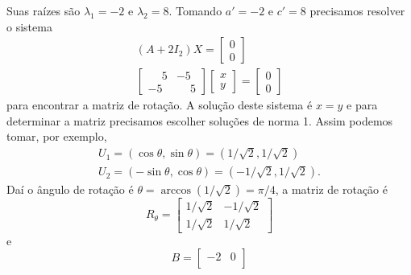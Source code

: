 \begin{exemplos}
\begin{enumerate}
\begin{solucao}
                  Suas raízes são $\lambda_1 = -2$ e $\lambda_2 = 8$. Tomando $a' = -2$ e $c' = 8$ precisamos resolver o sistema
                  \begin{align*}
                      (A + 2I_2)X = \begin{bmatrix}
                                        0 \\0
                                    \end{bmatrix} \\
                      \begin{bmatrix}
                          \phantom{-}5 & -5           \\
                          -5           & \phantom{-}5
                      \end{bmatrix} \begin{bmatrix}
                                        x \\y
                                    \end{bmatrix} = \begin{bmatrix}
                                                        0 \\0
                                                    \end{bmatrix}
                  \end{align*}
                  para encontrar a matriz de rotação. A solução deste sistema é $x = y$ e para determinar a matriz precisamos escolher soluções de norma 1.
                  Assim podemos tomar, por exemplo,
                  \begin{align*}
                      U_1 = (\cos\theta, \sin\theta) = (1/\sqrt{2}, 1/\sqrt{2}) \\
                      U_2 = (-\sin\theta, \cos\theta) = (-1/\sqrt{2}, 1/\sqrt{2}).
                  \end{align*}
                  Daí o ângulo de rotação é $\theta = \arccos(1/\sqrt{2}) = \pi/4$, a matriz de rotação é
                  \[
                      R_\theta = \begin{bmatrix}
                          1/\sqrt{2} & -1/\sqrt{2} \\
                          1/\sqrt{2} & 1/\sqrt{2}
                      \end{bmatrix}
                  \]
                  e
                  \[
                      B = \begin{bmatrix}
                          -2           & 0 \\

\end{bmatrix}\]
\end{solucao}
\end{enumerate}
\end{exemplos}
